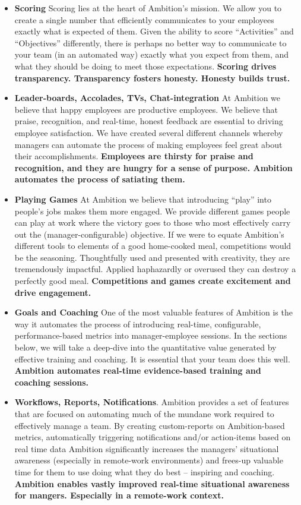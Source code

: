 \documentclass[paper=a4, fontsize=11pt abstract]{scrartcl}
\numberwithin{equation}{section}		%
\numberwithin{figure}{section}			%
\numberwithin{table}{section}				%
\begin{document}
\begin{itemize}
    \item \textbf{Scoring} Scoring lies at the heart of Ambition's mission.  We allow you to create a single number that efficiently communicates to your employees exactly what is expected of them.  Given the ability to score ``Activities'' and ``Objectives'' differently, there is perhaps no better way to communicate to your team (in an automated way) exactly what you expect from them, and what they should be doing to meet those expectations.  \textbf{Scoring drives transparency. Transparency fosters honesty.  Honesty builds trust.}
    
    \item \textbf{Leader-boards, Accolades, TVs, Chat-integration} At Ambition we believe that happy employees are productive employees.  We believe that praise, recognition, and real-time, honest feedback are essential to driving employee satisfaction.  We have created several different channels whereby managers can automate the process of making employees feel great about their accomplishments. \textbf{Employees are thirsty for praise and recognition, and they are hungry for a sense of purpose.  Ambition automates the process of satiating them.}
    
    \item \textbf{Playing Games} At Ambition we believe that introducing ``play'' into people's jobs makes them more engaged.  We provide different games people can play at work where the victory goes to those who most effectively carry out the (manager-configurable) objective.  If we were to equate Ambition's different tools to elements of a good home-cooked meal, competitions would be the seasoning.  Thoughtfully used and presented with creativity, they are tremendously impactful. Applied haphazardly or overused they can destroy a perfectly good meal. \textbf{Competitions and games create excitement and drive engagement.}
    
    \item \textbf{Goals and Coaching} One of the most valuable features of Ambition is the way it automates the process of introducing real-time, configurable, performance-based metrics into manager-employee sessions.  In the sections below, we will take a deep-dive into the quantitative value generated by effective training and coaching.  It is essential that your team does this well. \textbf{Ambition automates real-time evidence-based training and coaching sessions.}
   
   \item \textbf{Workflows, Reports, Notifications}. Ambition provides a set of features that are focused on automating much of the mundane work required to effectively manage a team.  By creating custom-reports on Ambition-based metrics, automatically triggering notifications and/or action-items based on real time data Ambition significantly increases the managers' situational awareness (especially in remote-work environments) and frees-up valuable time for them to use doing what they do best -- inspiring and coaching. \textbf{Ambition enables vastly improved real-time situational awareness for mangers.  Especially in a remote-work context.} 
    

\end{itemize}
\end{document}
